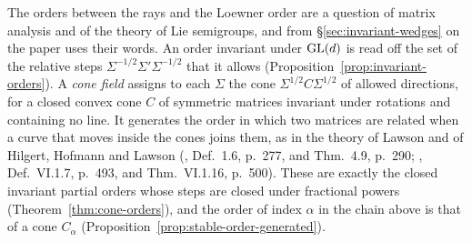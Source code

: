 The orders between the rays and the Loewner order are a question of matrix analysis and of the theory
of Lie semigroups, and from \S\ref{sec:invariant-wedges} on the paper uses their words. An order
invariant under $\mathrm{GL}(d)$ is read off the set of the relative steps $\Sigma^{-1/2}\Sigma'\Sigma^{-1/2}$
that it allows (Proposition~\ref{prop:invariant-orders}). A \emph{cone field} assigns to each $\Sigma$
the cone $\Sigma^{1/2}C\Sigma^{1/2}$ of allowed directions, for a closed convex cone $C$ of symmetric
matrices invariant under rotations and containing no line. It generates the order in which two
matrices are related when a curve that moves inside the cones joins them, as in the theory of Lawson
and of Hilgert, Hofmann and Lawson (, Def.~1.6, p.~277, and Thm.~4.9,
p.~290; , Def.~VI.1.7, p.~493, and Thm.~VI.1.16, p.~500). These are exactly the closed invariant partial
orders whose steps are closed under fractional powers (Theorem~\ref{thm:cone-orders}), and the order of index
$\alpha$ in the chain above is that of a cone $C_\alpha$ (Proposition~\ref{prop:stable-order-generated}).

